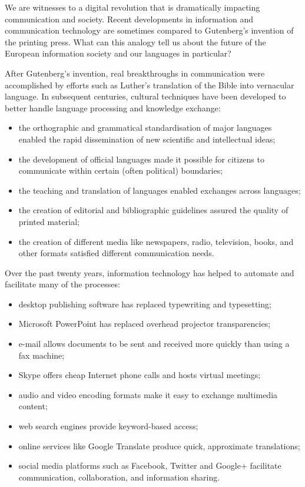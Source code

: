 \documentclass[]{../../metanetpaper}
\begin{document}
\begin{multicols}{2}

We are witnesses to a digital revolution that is dramatically impacting communication and society. Recent developments in information and communication technology are sometimes compared to Gutenberg’s invention of the printing press. What can this analogy tell us about the future of the European information society and our languages in particular?


After Gutenberg’s invention, real breakthroughs in communication were accomplished by efforts such as Luther’s translation of the Bible into vernacular language. In subsequent centuries, cultural techniques have been developed to better handle language processing and knowledge exchange:

\begin{itemize}
\item the orthographic and grammatical standardisation of major languages enabled the rapid dissemination of new scientific and intellectual ideas;
\item the development of official languages made it possible for citizens to communicate within certain (often political) boundaries;
\item the teaching and translation of languages enabled exchanges across languages;
\item the creation of editorial and bibliographic guidelines assured the quality of printed material;
\item the creation of different media like newspapers, radio, television, books, and other formats satisfied different communication needs. 
\end{itemize}

Over the past twenty years, information technology has helped to automate and facilitate many of the processes:

\begin{itemize}
\item desktop publishing software has replaced typewriting and typesetting;
\item Microsoft PowerPoint has replaced overhead projector transparencies;
\item e-mail allows documents to be sent and received more quickly than using a fax machine;
\item Skype offers cheap Internet phone calls and hosts virtual meetings;
\item audio and video encoding formats make it easy to exchange multimedia content;
\item web search engines provide keyword-based access;
\item online services like Google Translate produce quick, approximate translations;
\item social media platforms such as Facebook, Twitter and Google+ facilitate communication, collaboration, and information sharing.
\end{itemize}


\end{multicols}
\end{document}
